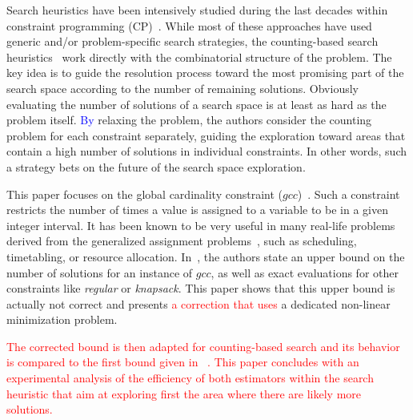 \documentclass[jair,twoside,11pt,theapa]{article}
\newcommand{\major}[1]{\textcolor{red}{#1}}
\newcommand{\minor}[1]{\textcolor{blue}{#1}}
\begin{document}
Search heuristics have been intensively studied during the last decades within constraint programming (CP)~\cite{BoussemartHLS04,Refalo04,MichelH12}. While most of these approaches have used generic and/or problem-specific search strategies, the counting\--based search heuristics~\cite{PesantQZ12} work directly with the combinatorial structure of the problem. The key idea is to guide the resolution process toward the most promising part of the search space according to the number of remaining solutions. 
Obviously evaluating the number of solutions of a search space is at least as hard as the problem itself.
\minor{By} relaxing the problem, the authors consider the counting problem for each constraint separately, guiding the exploration toward areas that contain a high number of solutions in individual constraints. In other words, such a strategy bets on the future of the search space exploration.

This paper focuses on the global cardinality constraint ($gcc$)~\cite{Regin96}. 
Such a constraint restricts the number of times a value is assigned to a variable to be in a given integer interval. It has been known to be very useful in many real-life problems derived from the generalized assignment problems~\cite{Ford}, such as scheduling, timetabling, or resource allocation. 
In~\cite{PesantQZ12}, the authors state an upper bound on the number of solutions for an instance of $gcc$, as well as exact evaluations for other constraints like \emph{regular} or \emph{knapsack}. This paper shows that this upper bound is actually not correct and presents \major{a correction that uses} a dedicated non\--linear minimization problem.  

\major{
	The corrected bound is then adapted for counting-based search and its behavior is compared to the first bound given in ~\cite{PesantQZ12}. This paper concludes with an experimental analysis of the efficiency of both estimators within the search heuristic that aim at exploring first the area where there are likely more solutions.
}
\end{document}
